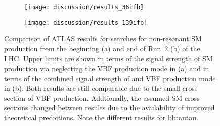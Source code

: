 \begin{figure}[tbp]
  \centering

  \begin{subfigure}[b]{0.53\textwidth}
    \texttt{[image: discussion/results\_36ifb]}

    \label{fig:atlas_run2_36ifb}
  \end{subfigure}\hfill%
  \begin{subfigure}[b]{0.46\textwidth}
    \texttt{[image: discussion/results\_139ifb]}

    \label{fig:atlas_run2_139ifb}
  \end{subfigure}

  \caption{Comparison of ATLAS results for searches for non-resonant
    SM \HH production from the beginning (a) and end of Run~2 (b) of
    the LHC. Upper limits are shown in terms of the signal strength of
    SM \HH production via \ggF neglecting the VBF production mode in
    (a) and in terms of the combined signal strength of \ggF and VBF
    production mode in (b). Both results are still comparable due to
    the small cross section of VBF \HH production. Addtionally, the
    assumed SM \HH cross sections changed between results due to the
    availability of improved theoretical predictions.  Note the
    different results for bbtautau. }
  \label{fig:atlas_run2_hh_results}
\end{figure}

\begin{table}[tbp]
  \centering


  \caption{Table of CMS results of searches for non-resonant
    production of Higgs boson pairs with an integrated luminosity of
    \SI{138}{\per\femto\barn}. Upper limits are shown at
    \SI{95}{\percent} CL on the signal strength of the combination of
    the \ggF and VBF production modes.}%
  \label{tab:cms_nonresonant}

  
\end{table}


